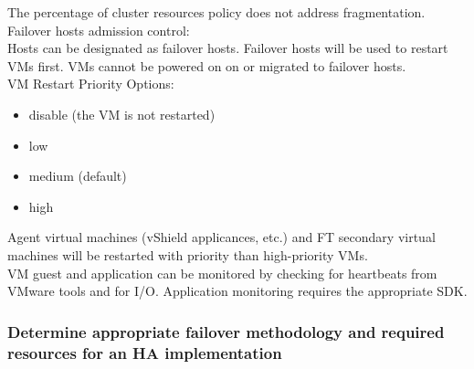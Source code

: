 The percentage of cluster resources policy does not address fragmentation.\\

Failover hosts admission control:\\

Hosts can be designated as failover hosts. Failover hosts will be used to
restart VMs first. VMs cannot be powered on on or migrated to failover hosts.\\

VM Restart Priority Options:

\begin{itemize}
\item disable (the VM is not restarted)
\item low
\item medium (default)
\item high
\end{itemize}

Agent virtual machines (vShield applicances, etc.) and FT secondary virtual
machines will be restarted with priority than high-priority VMs.\\

VM guest and application can be monitored by checking for heartbeats from
VMware tools and for I/O. Application monitoring requires the appropriate SDK.

\subsubsection{Determine appropriate failover methodology and required resources for an HA implementation}
